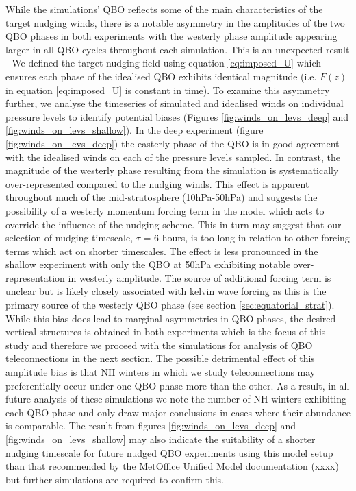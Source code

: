 While the simulations' QBO reflects some of the main characteristics of the target nudging winds, there is a notable asymmetry in the amplitudes of the two QBO phases in both experiments with the westerly phase amplitude appearing larger in all QBO cycles throughout each simulation. This is an unexpected result - We defined the target nudging field using equation \ref{eq:imposed_U} which ensures each phase of the idealised QBO exhibits identical magnitude (i.e. $F(z)$ in equation \ref{eq:imposed_U} is constant in time). To examine this asymmetry further, we analyse the timeseries of simulated and idealised winds on individual pressure levels to identify potential biases (Figures \ref{fig:winds_on_levs_deep} and \ref{fig:winds_on_levs_shallow}). In the deep experiment (figure \ref{fig:winds_on_levs_deep}) the easterly phase of the QBO is in good agreement with the idealised winds on each of the pressure levels sampled. In contrast, the magnitude of the westerly phase resulting from the simulation is systematically over-represented compared to the nudging winds. This effect is apparent throughout much of the mid-stratosphere (10hPa-50hPa) and suggests the possibility of a westerly momentum forcing term in the model which acts to override the influence of the nudging scheme. This in turn may suggest that our selection of nudging timescale, $\tau$ = 6 hours, is too long in relation to other forcing terms which act on shorter timescales. The effect is less pronounced in the shallow experiment with only the QBO at 50hPa exhibiting notable over-representation in westerly amplitude. The source of additional forcing term is unclear but is likely closely associated with kelvin wave forcing as this is the primary source of the westerly QBO phase (see section \ref{sec:equatorial_strat}). While this bias does lead to marginal asymmetries in QBO phases, the desired vertical structures is obtained in both experiments which is the focus of this study and therefore we proceed with the simulations for analysis of QBO teleconnections in the next section. The possible detrimental effect of this amplitude bias is that NH winters in which we study teleconnections may preferentially occur under one QBO phase more than the other. As a result, in all future analysis of these simulations we note the number of NH winters exhibiting each QBO phase and only draw major conclusions in cases where their abundance is comparable. The result from figures \ref{fig:winds_on_levs_deep} and \ref{fig:winds_on_levs_shallow} may also indicate the suitability of a shorter nudging timescale for future nudged QBO experiments using this model setup than that recommended by the MetOffice Unified Model documentation (xxxx) but further simulations are required to confirm this.

